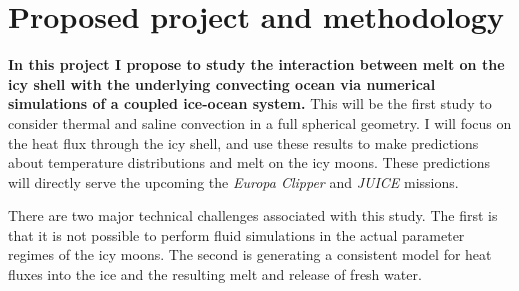 \documentclass[12pt]{article}
\begin{document}
\section{Proposed project and methodology}

\textbf{In this project I propose to study the interaction between melt on the icy shell with the underlying convecting ocean via numerical simulations of a coupled ice-ocean system.} This will be the first study to consider thermal and saline convection in a full spherical geometry.
I will focus on the heat flux through the icy shell, and use these results to make predictions about temperature distributions and melt on the icy moons. These predictions will directly serve the upcoming the \textit{Europa Clipper} and \textit{JUICE} missions.

There are two major technical challenges associated with this study. The first is that it is not possible to perform fluid simulations in the actual parameter regimes of the icy moons. The second is generating a consistent model for heat fluxes into the ice and the resulting melt and release of fresh water.
\end{document}
